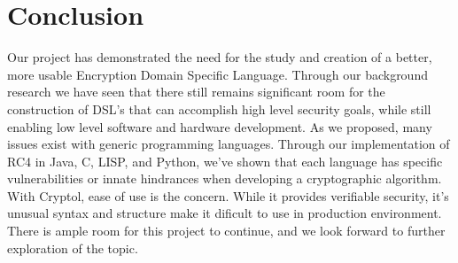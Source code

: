 \section{Conclusion}
Our project has demonstrated the need for the study and creation of a better, more usable Encryption Domain Specific Language. Through our background research we have seen that there still remains significant room for the construction of DSL's that can accomplish high level security goals, while still enabling low level software and hardware development. As we proposed, many issues exist with generic programming languages. Through our implementation of RC4 in Java, C, LISP, and Python, we've shown that each language has specific vulnerabilities or innate hindrances when developing a cryptographic algorithm. With Cryptol, ease of use is the concern. While it provides verifiable security, it's unusual syntax and structure make it dificult to use in production environment. There is ample room for this project to continue, and we look forward to further exploration of the topic.
